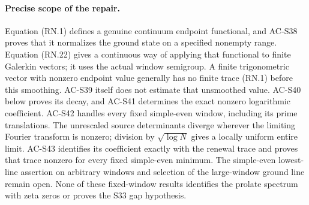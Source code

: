 \paragraph{Precise scope of the repair.}
Equation (RN.1) defines a genuine continuum endpoint functional,
and AC-S38 proves that it normalizes the ground state on a specified
nonempty range.  Equation (RN.22) gives a continuous way of applying
that functional to finite Galerkin vectors; it uses the actual
window semigroup.  A finite trigonometric vector with nonzero endpoint
value generally has no finite trace (RN.1) before this smoothing.
AC-S39 itself does not estimate that unsmoothed value.
AC-S40 below proves its decay, and AC-S41 determines the exact
nonzero logarithmic coefficient.  AC-S42 handles every fixed
simple-even window, including its prime translations.
The unrescaled source determinants diverge wherever the limiting
Fourier transform is nonzero; division by \(\sqrt{\log N}\)
gives a locally uniform entire limit.
AC-S43 identifies its coefficient exactly with the renewal trace
and proves that trace nonzero for every fixed simple-even minimum.
The simple-even lowest-line assertion on arbitrary windows and
selection of the large-window ground line remain open.
None of these fixed-window results identifies the prolate
spectrum with zeta zeros or proves the S33 gap hypothesis.
